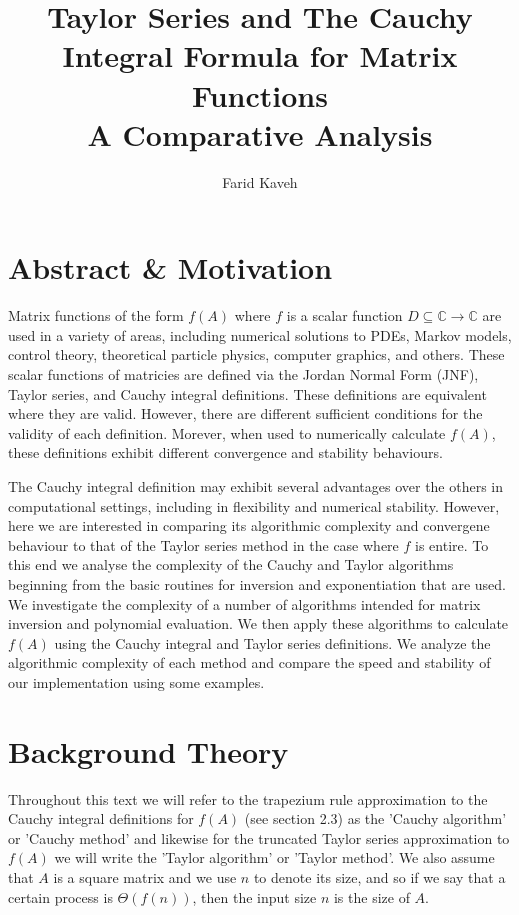 \documentclass{article}
\title{Taylor Series and The Cauchy Integral Formula for Matrix Functions \\ \small{A Comparative Analysis}}
\author{Farid Kaveh}
\newcommand{\bC}{\mathbb{C}}
\begin{document}
\maketitle
\section{Abstract \& Motivation}
Matrix functions of the form $f(A)$ where $f$ is a scalar function $D \subseteq \bC \rightarrow \bC$ are used in a variety of areas, including numerical solutions to PDEs, Markov models, control theory, theoretical particle physics, computer graphics, and others. These scalar functions of matricies are defined via the Jordan Normal Form (JNF), Taylor series, and Cauchy integral definitions. These definitions are equivalent where they are valid. However, there are different sufficient conditions for the validity of each definition. Morever, when used to numerically calculate $f(A)$, these definitions exhibit different convergence and stability behaviours.

The Cauchy integral definition may exhibit several advantages over the others in computational settings, including in flexibility and numerical stability. However, here we are interested in comparing its algorithmic complexity and convergene behaviour to that of the Taylor series method in the case where $f$ is entire. To this end we analyse the complexity of the Cauchy and Taylor algorithms beginning from the basic routines for inversion and exponentiation that are used. We investigate the complexity of a number of algorithms intended for matrix inversion and polynomial evaluation. We then apply these algorithms to calculate $f(A)$ using the Cauchy integral and Taylor series definitions. We analyze the algorithmic complexity of each method and compare the speed and stability of our implementation using some examples.



\section{Background Theory}

Throughout this text we will refer to the trapezium rule approximation to the Cauchy integral definitions for $f(A)$ (see section 2.3) as the 'Cauchy algorithm' or 'Cauchy method' and likewise for the truncated Taylor series approximation to $f(A)$ we will write the 'Taylor algorithm' or 'Taylor method'. We also assume that $A$ is a square matrix and we use $n$ to denote its size, and so if we say that a certain process is $\Theta(f(n))$, then the input size $n$ is the size of $A$.
\end{document}
